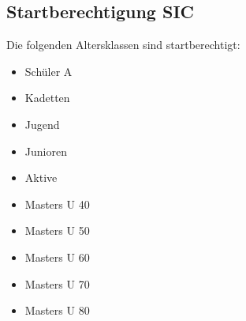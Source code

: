\subsection{Startberechtigung SIC}
Die folgenden Altersklassen sind startberechtigt:
\begin{itemize}
	\item Schüler A
	\item Kadetten
	\item Jugend
	\item Junioren
	\item Aktive
	\item Masters U 40
	\item Masters U 50
	\item Masters U 60
	\item Masters U 70
	\item Masters U 80
\end{itemize}